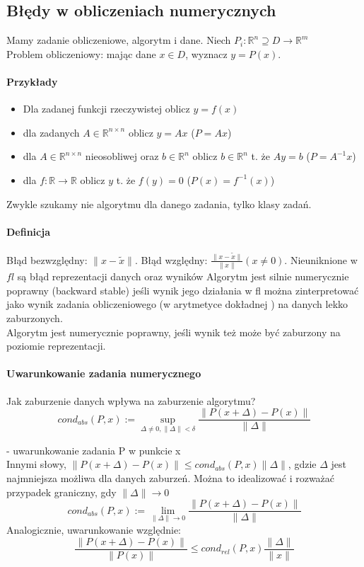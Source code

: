 \documentclass{article}
\begin{document}
\subsection{Błędy w obliczeniach numerycznych}
Mamy zadanie obliczeniowe, algorytm i dane. Niech $ P_i: \mathbb{R}^n\supseteq D\rightarrow\mathbb{R}^m $ \\
Problem obliczeniowy: mając dane $ x\in D $, wyznacz $y=P(x)$.\\
\paragraph{Przykłady}
\begin{itemize}
\item Dla zadanej funkcji rzeczywistej oblicz $ y=f(x) $
\item dla zadanych $ A\in\mathbb{R}^{n\times n} $ oblicz $ y=Ax $ ($ P=Ax $)
\item dla $ A\in\mathbb{R}^{n\times n} $ nieosobliwej oraz $ b\in\mathbb{R}^n $ oblicz $ b\in\mathbb{R}^n $ t. że $ Ay=b $ ($P=A^{-1}x $)
\item dla $ f: \mathbb{R}\rightarrow\mathbb{R}$ oblicz $ y $ t. że $f(y)=0$ ($P(x)=f^{-1}(x)  $)
\end{itemize}
Zwykle szukamy nie algorytmu dla danego zadania, tylko klasy zadań.
\paragraph{Definicja}
Błąd bezwzględny: $ \|x-\tilde{x}\| $.
Błąd względny: $ \frac{\|x-\tilde{x}\|}{\|x\|} (x\not=0)$.
Nieuniknione w $ fl $ są błąd reprezentacji danych oraz wyników
Algorytm jest silnie numerycznie poprawny (backward stable) jeśli wynik jego działania w fl można zinterpretować jako wynik zadania obliczeniowego (w arytmetyce dokładnej ) na danych lekko zaburzonych.\\
Algorytm jest numerycznie poprawny, jeśli wynik też może być zaburzony na poziomie reprezentacji.
\paragraph{Uwarunkowanie zadania numerycznego}
Jak zaburzenie danych wpływa na zaburzenie algorytmu?
$$cond_{abs}(P,x):=\sup_{\Delta\not=0, \|\Delta\|<\delta}\frac{\|P(x+\Delta)-P(x)\|}{\|\Delta\|}$$

- uwarunkowanie zadania P w punkcie x\\
Innymi słowy, $ \|P(x+\Delta)-P(x)\|\le cond_{abs}(P,x)\|\Delta\| $, gdzie $ \Delta $ jest najmniejsza możliwa dla danych zaburzeń.
Można to idealizować i rozważać przypadek graniczny, gdy $ \|\Delta\|\rightarrow0 $
$$cond_{abs}(P, x):=\lim_{\|\Delta\|\rightarrow0}\frac{\|P(x+\Delta)-P(x)\|}{\|\Delta\|}$$
Analogicznie, uwarunkowanie względnie: 
$$\frac{\|P(x+\Delta)-P(x)\|}{\|P(x)\|}\le cond_{rel}(P, x)\frac{\|\Delta\|}{\|x\|}$$
\end{document}
